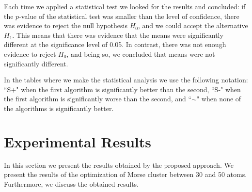Each time we applied a statistical test we looked for the results and concluded: if the $p$-value of the statistical test was smaller than the level of confidence, there was evidence to reject the null hypothesis $H_{0}$, and we could accept the alternative $H_{1}$. This means that there was evidence that the means were significantly different  at the significance level of 0.05. In contrast, there was not enough evidence to reject $H_{0}$, and being so, we concluded that means were not significantly different.

In the tables where we make the statistical analysis we use the following notation: ``S+" when the first algorithm is significantly better than the second, ``S-" when the first algorithm is significantly worse than the second, and ``$\sim$" when none of the algorithms is significantly better.



\section{Experimental Results}
	In this section we present the results obtained by the proposed approach. We present the results of the optimization of Morse cluster between 30 and 50 atoms. Furthermore, we discuss the obtained results.


